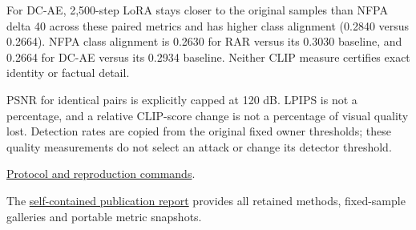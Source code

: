 For DC-AE, 2,500-step LoRA stays closer to the original samples than
NFPA delta 40 across these paired metrics and has higher class alignment
(0.2840 versus 0.2664). NFPA class alignment is 0.2630 for RAR versus
its 0.3030 baseline, and 0.2664 for DC-AE versus its 0.2934 baseline.
Neither CLIP measure certifies exact identity or factual detail.

PSNR for identical pairs is explicitly capped at 120 dB. LPIPS is not a
percentage, and a relative CLIP-score change is not a percentage of
visual quality lost. Detection rates are copied from the original fixed
owner thresholds; these quality measurements do not select an attack or
change its detector threshold.

\href{records/docs/matched_image_quality.tex}{Protocol and reproduction
commands}.

The \href{../docs/watermarking/README.md}{self-contained publication
report} provides all retained methods, fixed-sample galleries and
portable metric snapshots.
